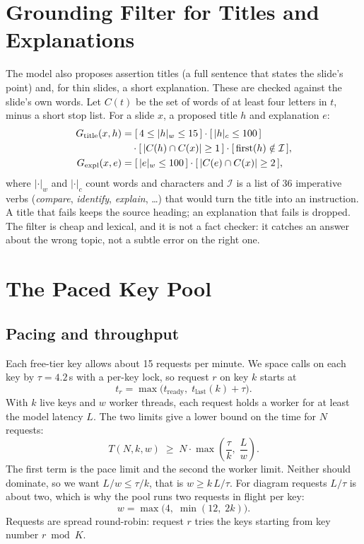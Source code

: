 \documentclass[runningheads]{llncs}
\begin{document}
\section{Grounding Filter for Titles and Explanations}
\label{sec:ground}
The model also proposes assertion titles (a full sentence that states the slide's point) and, for thin slides, a short
explanation. These are checked against the slide's own words. Let $C(t)$ be the set of words of at least four letters in $t$,
minus a short stop list. For a slide $x$, a proposed title $h$ and explanation $e$:
\begin{align}
G_{\text{title}}(x, h) &= [\,4 \le |h|_{w} \le 15\,]\cdot[\,|h|_{c} \le 100\,] \notag\\
 &\quad \cdot[\,|C(h) \cap C(x)| \ge 1\,]\cdot[\,\mathrm{first}(h) \notin \mathcal{I}\,],\\
G_{\text{expl}}(x, e) &= [\,|e|_{w} \le 100\,]\cdot[\,|C(e) \cap C(x)| \ge 2\,],
\end{align}
where $|\cdot|_w$ and $|\cdot|_c$ count words and characters and $\mathcal{I}$ is a list of 36 imperative verbs (\emph{compare},
\emph{identify}, \emph{explain}, \ldots) that would turn the title into an instruction. A title that fails keeps the source
heading; an explanation that fails is dropped. The filter is cheap and lexical, and it is not a fact checker: it catches an
answer about the wrong topic, not a subtle error on the right one.

\section{The Paced Key Pool}
\label{sec:pool}
\subsection{Pacing and throughput}
Each free-tier key allows about 15 requests per minute. We space calls on each key by $\tau = 4.2$\,s with a per-key lock, so
request $r$ on key $k$ starts at
\begin{equation}
t_r = \max\big(t_{\text{ready}},\; t_{\text{last}}(k) + \tau\big).
\end{equation}
With $k$ live keys and $w$ worker threads, each request holds a worker for at least the model latency $L$. The two limits give a
lower bound on the time for $N$ requests:
\begin{equation}
\label{eq:bound}
T(N, k, w) \;\ge\; N \cdot \max\!\left(\frac{\tau}{k},\; \frac{L}{w}\right).
\end{equation}
The first term is the pace limit and the second the worker limit. Neither should dominate, so we want $L/w \le \tau/k$, that is
$w \ge k\,L/\tau$. For diagram requests $L/\tau$ is about two, which is why the pool runs two requests in flight per key:
\begin{equation}
w = \max\big(4,\; \min(12,\; 2k)\big).
\end{equation}
Requests are spread round-robin: request $r$ tries the keys starting from key number $r \bmod K$.
\end{document}
